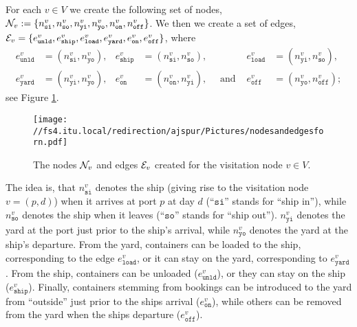 For each $v\in V$ we create the following set of nodes, $\mathcal{N}_v:=\{n^v_{\texttt{si}}, n^v_\texttt{so}, n^v_\texttt{yi}, n^v_\texttt{yo}, n^v_{\texttt{on}}, n^v_\texttt{off}\}$.%
%
We then  we create a set of edges, $\mathcal{E}_v = \{e^v_\texttt{unld}, e^v_\texttt{ship}, e^v_\texttt{load}, e^v_\texttt{yard}, e^v_\texttt{on}, e^v_\texttt{off}\}$, where
\begin{align*}
e^v_\texttt{unld} &= (n^v_\texttt{si},n^v_\texttt{yo}),
& e^v_\texttt{ship} &= (n^v_\texttt{si},n^v_\texttt{so}),
& e^v_\texttt{load} &=(n^v_\texttt{yi},n^v_\texttt{so}),\\
 e^v_\texttt{yard} &=(n^v_\texttt{yi},n^v_\texttt{yo}),
& e^v_\texttt{on}   &=(n^v_\texttt{on},n^v_\texttt{yi}), \quad\text{ and }
& e^v_\texttt{off} & =(n^v_\texttt{yo},n^v_\texttt{off});
\end{align*}
see Figure \ref{fig:nodesAndEdges}. %
%
\begin{figure}[htbp]
	\centering
		\texttt{[image: //fs4.itu.local/redirection/ajspur/Pictures/nodesandedgesforn.pdf]}
	\caption{The nodes $\mathcal{N}_v$ and edges $\mathcal{E}_v$ created for the visitation node $v\in V$.}
	\label{fig:nodesAndEdges}
\end{figure}
The idea is, that $n^v_\texttt{si}$ denotes the ship (giving rise to the visitation node $v=(p,d)$) when it arrives at port $p$ at day $d$ (``$\texttt{si}$'' stands for ``ship in''), while $n^v_\texttt{so}$ denotes the ship when it leaves (``$\texttt{so}$'' stands for ``ship out''). $n^v_\texttt{yi}$ denotes the yard at the port just prior to the ship's arrival, while $n^v_\texttt{yo}$ denotes the yard at the ship's departure. From the yard, containers can be loaded to the ship, corresponding to the edge $e^v_\texttt{load}$, or it can stay on the yard, corresponding to $e^v_\texttt{yard}$. From the ship, containers can be unloaded ($e^v_\texttt{unld}$), or they can stay on the ship ($e^v_\texttt{ship}$). Finally, containers stemming from bookings can be introduced to the yard from ``outside'' just prior to the ships arrival ($e^v_\texttt{on}$), while others can be removed from the yard when the ships departure ($e^v_\texttt{off}$). 


